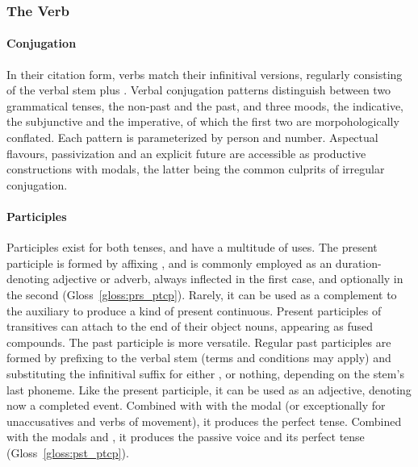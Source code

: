 \subsubsection{The Verb}
\paragraph{Conjugation}
In their citation form, verbs match their infinitival versions, regularly consisting of the verbal stem plus .
Verbal conjugation patterns distinguish between two grammatical tenses, the non-past and the past, and three moods, the indicative, the subjunctive and the imperative, of which the first two are morpohologically conflated.
Each pattern is parameterized by person and number.
Aspectual flavours, passivization and an explicit future are accessible as productive constructions with modals, the latter being the common culprits of irregular conjugation.

\paragraph{Participles}
Participles exist for both tenses, and have a multitude of uses.
The present participle is formed by affixing , and is commonly employed as an duration-denoting adjective or adverb, always inflected in the first case, and optionally in the second (Gloss~\ref{gloss:prs_ptcp}).
Rarely, it can be used as a complement to the auxiliary  to produce a kind of present continuous.
Present participles of transitives can attach to the end of their object nouns, appearing as fused compounds.
The past participle is more versatile.
Regular past participles are formed by prefixing  to the verbal stem (terms and conditions may apply) and substituting the infinitival suffix for either ,  or nothing, depending on the stem's last phoneme.
Like the present participle, it can be used as an adjective, denoting now a completed event.
Combined with with the modal  (or exceptionally  for unaccusatives and verbs of movement), it produces the perfect tense.
Combined with the modals  and , it produces the passive voice and its perfect tense (Gloss~\ref{gloss:pst_ptcp}).


